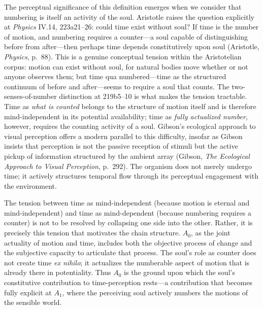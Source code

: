 The perceptual significance of this definition emerges when we consider that numbering is itself an activity of the soul. Aristotle raises the question explicitly at \textit{Physics} IV.14, 223a21--26: could time exist without soul? If time is the number of motion, and numbering requires a counter---a soul capable of distinguishing before from after---then perhaps time depends constitutively upon soul (Aristotle, \textit{Physics}, p.~88). This is a genuine conceptual tension within the Aristotelian corpus: motion can exist without soul, for natural bodies move whether or not anyone observes them; but time qua numbered---time as the structured continuum of before and after---seems to require a soul that counts. The two-senses-of-number distinction at 219b5--10 is what makes the tension tractable. Time as \textit{what is counted} belongs to the structure of motion itself and is therefore mind-independent in its potential availability; time as \textit{fully actualized number}, however, requires the counting activity of a soul. Gibson's ecological approach to visual perception offers a modern parallel to this difficulty, insofar as Gibson insists that perception is not the passive reception of stimuli but the active pickup of information structured by the ambient array (Gibson, \textit{The Ecological Approach to Visual Perception}, p.~292). The organism does not merely undergo time; it actively structures temporal flow through its perceptual engagement with the environment.

The tension between time as mind-independent (because motion is eternal and mind-independent) and time as mind-dependent (because numbering requires a counter) is not to be resolved by collapsing one side into the other. Rather, it is precisely this tension that motivates the chain structure. $A_0$, as the joint actuality of motion and time, includes both the objective process of change and the subjective capacity to articulate that process. The soul's role as counter does not create time \textit{ex nihilo}; it actualizes the numberable aspect of motion that is already there in potentiality. Thus $A_0$ is the ground upon which the soul's constitutive contribution to time-perception rests---a contribution that becomes fully explicit at $A_1$, where the perceiving soul actively numbers the motions of the sensible world.
